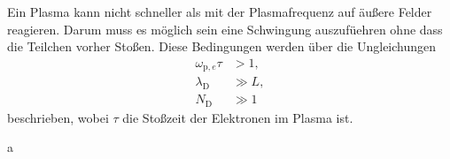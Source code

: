 Ein Plasma kann nicht schneller als mit der Plasmafrequenz auf \"au\ss ere Felder reagieren.
Darum muss es m\"oglich sein eine Schwingung auszuf\"uehren ohne dass die Teilchen vorher Sto\ss en.
Diese Bedingungen werden \"uber die Ungleichungen
\begin{align}
\omega_{\text{p},e}\tau
&>1,
\label{eq:c1}\\
\lambda_\text{D}
&\gg L,
\label{eq:c2}\\
N_\text{D}
&\gg 1
\label{eq:c3}
\end{align}
beschrieben, wobei $\tau$ die Sto\ss zeit der Elektronen im Plasma ist.
\cite{stroth11a}










\cite{stroth11a}




\cite{anleitung}

a\cite{schwabedissen99a}
\cite{taylor70a}